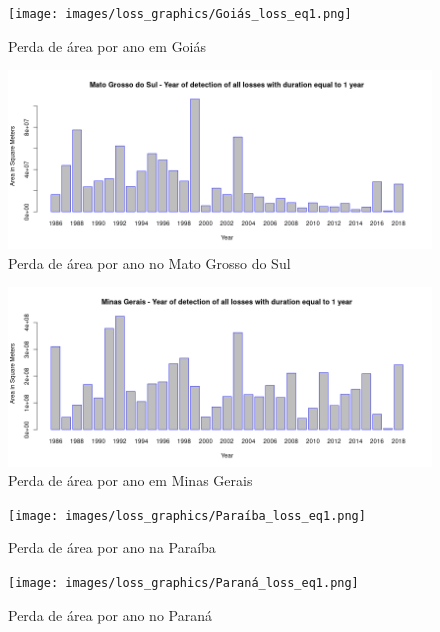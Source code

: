 \begin{appendices}
\begin{figure}[H]
    \centering
    \texttt{[image: images/loss\_graphics/Goiás\_loss\_eq1.png]}
    \caption{Perda de área por ano em Goiás}
    \label{fig:loss_goias}
\end{figure}

\begin{figure}[H]
    \centering
    \includegraphics[scale=.5]{images/loss_graphics/Mato Grosso do Sul_loss_eq1.png}
    \caption{Perda de área por ano no Mato Grosso do Sul}
    \label{fig:loss_mato_grosso_sul}
\end{figure}

\begin{figure}[H]
    \centering
    \includegraphics[scale=.5]{images/loss_graphics/Minas Gerais_loss_eq1.png}
    \caption{Perda de área por ano em Minas Gerais}
    \label{fig:loss_minas_gerais}
\end{figure}

\begin{figure}[H]
    \centering
    \texttt{[image: images/loss\_graphics/Paraíba\_loss\_eq1.png]}
    \caption{Perda de área por ano na Paraíba}
    \label{fig:loss_paraiba}
\end{figure}

\begin{figure}[H]
    \centering
    \texttt{[image: images/loss\_graphics/Paraná\_loss\_eq1.png]}
    \caption{Perda de área por ano no Paraná}
    \label{fig:loss_parana}
\end{figure}


\end{appendices}
